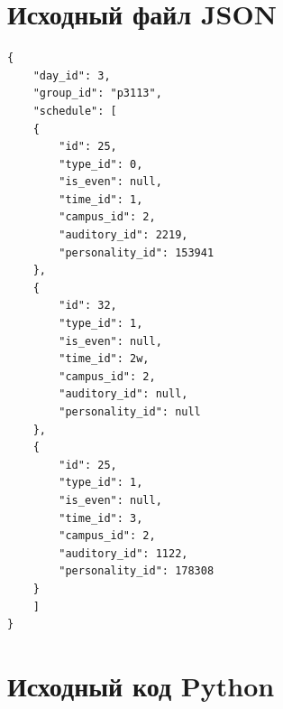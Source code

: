 \documentclass[11pt]{article}
\begin{document}
\section{Исходный файл JSON}
\label{sec:org72288bc}
\scriptsize
\lstset{language=json,label= ,caption= ,captionpos=b,numbers=none}
\begin{lstlisting}
{
    "day_id": 3,
    "group_id": "p3113",
    "schedule": [
	{
	    "id": 25,
	    "type_id": 0,
	    "is_even": null,
	    "time_id": 1,
	    "campus_id": 2,
	    "auditory_id": 2219,
	    "personality_id": 153941
	},
	{
	    "id": 32,
	    "type_id": 1,
	    "is_even": null,
	    "time_id": 2w,
	    "campus_id": 2,
	    "auditory_id": null,
	    "personality_id": null
	},
	{
	    "id": 25,
	    "type_id": 1,
	    "is_even": null,
	    "time_id": 3,
	    "campus_id": 2,
	    "auditory_id": 1122,
	    "personality_id": 178308
	}
    ]
}
\end{lstlisting}

\section{Исходный код Python}
\label{sec:org48bbd5e}
\end{document}
